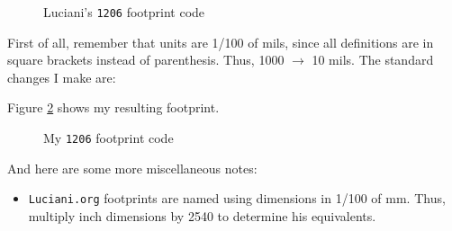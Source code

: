 \begin{figure}[ht]
  \begin{center}
    \begin{minipage}{10cm}
      
    \end{minipage}
    \caption{Luciani's \texttt{1206} footprint
      code\label{luciani_1206}}
  \end{center}
\end{figure}

First of all, remember that units are 1/100 of mils, since all
definitions are in square brackets instead of parenthesis.  Thus, 1000
$\rightarrow$ 10 mils.  The standard changes I make are:

Figure \ref{jps_1206} shows my resulting footprint.
\begin{figure}[ht]
  \begin{center}
    \begin{minipage}{10cm}
      
    \end{minipage}
    \caption{My \texttt{1206} footprint code\label{jps_1206}}
  \end{center}
\end{figure}

And here are some more miscellaneous notes:
\begin{itemize}
\item \texttt{Luciani.org} footprints are named using dimensions in
  1/100 of mm.  Thus, multiply inch dimensions by 2540 to determine
  his equivalents.
\end{itemize}

